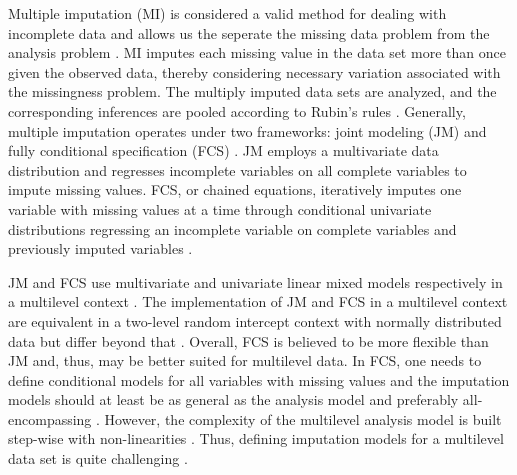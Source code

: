 \documentclass[10pt, a4paper, titlepage]{article}
\begin{document}
Multiple imputation (MI) is considered a valid method for dealing with incomplete data and allows us the seperate the missing data problem from the analysis problem \citep{mistlerComparisonJointModel2017, buurenFlexibleImputationMissing2018, enders2017, burgette2010, austin2021, audigier2018, vanbuuren2007, grund2021, hughes2014}. MI imputes each missing value in the data set more than once given the observed data, thereby considering necessary variation associated with the missingness problem. The multiply imputed data sets are analyzed, and the corresponding inferences are pooled according to Rubin's rules \citep{buurenFlexibleImputationMissing2018, austin2021, rubin1987, carpenter2013}.
Generally, multiple imputation operates under two frameworks: joint modeling (JM) and fully conditional specification (FCS) \citep{mistlerComparisonJointModel2017, buurenFlexibleImputationMissing2018, enders2018, enders2018a, hughes2014}. JM employs a multivariate data distribution and regresses incomplete variables on all complete variables to impute missing values. FCS, or chained equations, iteratively imputes one variable with missing values at a time through conditional univariate distributions regressing an incomplete variable on complete variables and previously imputed variables \citep{mistlerComparisonJointModel2017, buurenFlexibleImputationMissing2018, enders2016, enders2018, enders2018a, hughes2014, grund2018a}.

JM and FCS use multivariate and univariate linear mixed models respectively in a multilevel context \citep{mistlerComparisonJointModel2017, enders2018}. The implementation of JM and FCS in a multilevel context are equivalent in a two-level random intercept context with normally distributed data but differ beyond that \citep{enders2016, enders2018a}. Overall, FCS is believed to be more flexible than JM \citep{audigier2018, burgette2010, vanbuuren2007, grund2018a} and, thus, may be better suited for multilevel data. In FCS, one needs to define conditional models for all variables with missing values \citep{mistlerComparisonJointModel2017, buurenFlexibleImputationMissing2018, enders2018, enders2018a, enders2016, hughes2014, grund2018a} and the imputation models should at least be as general as the analysis model and preferably all-encompassing \citep{grund2018}. However, the complexity of the multilevel analysis model is built step-wise with non-linearities \citep{hox2017, hox2011}. Thus, defining imputation models for a multilevel data set is quite challenging \citep{buurenFlexibleImputationMissing2018, burgette2010, hox2011}.
\end{document}
